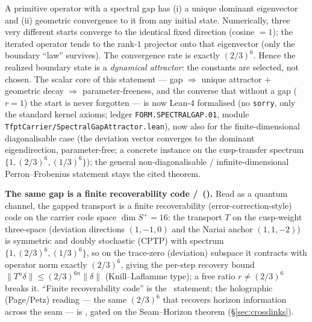 \begin{keybox}
A primitive operator with a spectral gap has (i) a unique dominant eigenvector and (ii) geometric
convergence to it from any initial state. Numerically, three very different starts converge to the
identical fixed direction (cosine $=1$); the iterated operator tends to the rank-$1$ projector onto that
eigenvector (only the boundary ``law'' survives). The convergence rate is exactly $(2/3)^6$. Hence the
realized boundary state is a \emph{dynamical attractor}: the constants are selected, not chosen.
The scalar core of this statement --- gap $\Rightarrow$ unique attractor $+$ geometric decay $\Rightarrow$
parameter-freeness, and the converse that without a gap ($r{=}1$) the start is never forgotten --- is now
Lean-4 formalised (no \texttt{sorry}, only the standard kernel axioms; ledger \texttt{FORM.SPECTRALGAP.01},
module \texttt{TfptCarrier/SpectralGapAttractor.lean}), now also for the finite-dimensional diagonalisable case
(the deviation vector converges to the dominant eigendirection, parameter-free; a concrete instance on the
cusp-transfer spectrum $\{1,(2/3)^6,(1/3)^6\}$); the general non-diagonalisable / infinite-dimensional
Perron--Frobenius statement stays the cited theorem.
\end{keybox}

\noindent\textbf{The same gap is a finite recoverability code \mE/\mC\ ().} Read as
a quantum channel, the gapped transport is a finite recoverability (error-correction-style) code on the
carrier code space $\dim S^+=16$: the transport $T$ on the cusp-weight three-space (deviation directions
$(1,{-}1,0)$ and the Nariai anchor $(1,1,{-}2)$) is symmetric and doubly stochastic (CPTP) with spectrum
$\{1,(2/3)^6,(1/3)^6\}$, so on the trace-zero (deviation) subspace it contracts with operator norm exactly
$(2/3)^6$, giving the per-step recovery bound $\|T^n\delta\|\le(2/3)^{6n}\|\delta\|$ (Knill--Laflamme type);
a free ratio $r\neq(2/3)^6$ breaks it. ``Finite recoverability code'' is the \mE\ statement; the holographic
(Page/Petz) reading --- the same $(2/3)^6$ that recovers horizon information across the seam --- is \mC,
gated on the Seam--Horizon theorem (\S\ref{sec:crosslinks}).

